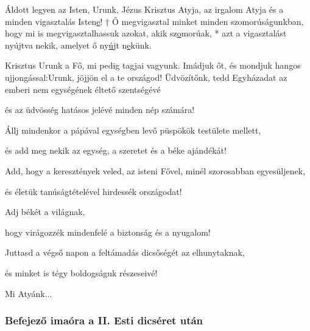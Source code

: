 \documentclass[twoside]{article}
\begin{document}
{\centering{}}

Áldott legyen az Isten, Urunk, Jézus Krisztus Atyja, az irgalom Atyja és a minden vigasztalás Isten\underline{e}! † Ő megvigasztal minket minden szomorúságunkban, hogy mi is megvigasztalhassuk azokat, akik sz\underline{o}morúak, * azt a vigasztalást nyújtva nekik, amelyet ő ny\underline{ú}jt n\underline{e}künk.



\begin{preces}{Krisztus Urunk a Fő, mi pedig tagjai vagyunk. Imádjuk őt, és mondjuk hangos ujjongással:}{Urunk, jöjjön el a te országod!}
  Üdvözítőnk, tedd Egyházadat az emberi nem egységének éltető szentségévé

  \reddash és az üdvösség hatásos jelévé minden nép számára!

  Állj mindenkor a pápával egységben levő püspökök testülete mellett,

  \reddash és add meg nekik az egység, a szeretet és a béke ajándékát!

  Add, hogy a keresztények veled, az isteni Fővel, minél szorosabban egyesüljenek,

  \reddash és életük tanúságtételével hirdessék országodat!

  Adj békét a világnak,

  \reddash hogy virágozzék mindenfelé a biztonság és a nyugalom!

  Juttasd a végső napon a feltámadás dicsőségét az elhunytaknak,

  \reddash és minket is tégy boldogságuk részeseivé!
\end{preces}
Mi Atyánk...


\subsubsection*{Befejező imaóra a II. Esti dicséret után}
\end{document}
